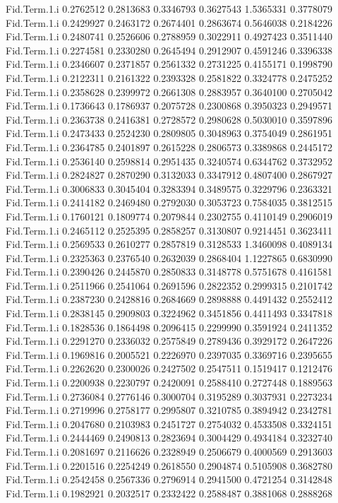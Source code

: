\documentclass[11pt]{article} %
\begin{document}
\begin{Schunk}
\begin{Soutput}
Fid.Term.1.i 0.2762512 0.2813683 0.3346793 0.3627543 1.5365331 0.3778079
Fid.Term.1.i 0.2429927 0.2463172 0.2674401 0.2863674 0.5646038 0.2184226
Fid.Term.1.i 0.2480741 0.2526606 0.2788959 0.3022911 0.4927423 0.3511440
Fid.Term.1.i 0.2274581 0.2330280 0.2645494 0.2912907 0.4591246 0.3396338
Fid.Term.1.i 0.2346607 0.2371857 0.2561332 0.2731225 0.4155171 0.1998790
Fid.Term.1.i 0.2122311 0.2161322 0.2393328 0.2581822 0.3324778 0.2475252
Fid.Term.1.i 0.2358628 0.2399972 0.2661308 0.2883957 0.3640100 0.2705042
Fid.Term.1.i 0.1736643 0.1786937 0.2075728 0.2300868 0.3950323 0.2949571
Fid.Term.1.i 0.2363738 0.2416381 0.2728572 0.2980628 0.5030010 0.3597896
Fid.Term.1.i 0.2473433 0.2524230 0.2809805 0.3048963 0.3754049 0.2861951
Fid.Term.1.i 0.2364785 0.2401897 0.2615228 0.2806573 0.3389868 0.2445172
Fid.Term.1.i 0.2536140 0.2598814 0.2951435 0.3240574 0.6344762 0.3732952
Fid.Term.1.i 0.2824827 0.2870290 0.3132033 0.3347912 0.4807400 0.2867927
Fid.Term.1.i 0.3006833 0.3045404 0.3283394 0.3489575 0.3229796 0.2363321
Fid.Term.1.i 0.2414182 0.2469480 0.2792030 0.3053723 0.7584035 0.3812515
Fid.Term.1.i 0.1760121 0.1809774 0.2079844 0.2302755 0.4110149 0.2906019
Fid.Term.1.i 0.2465112 0.2525395 0.2858257 0.3130807 0.9214451 0.3623411
Fid.Term.1.i 0.2569533 0.2610277 0.2857819 0.3128533 1.3460098 0.4089134
Fid.Term.1.i 0.2325363 0.2376540 0.2632039 0.2868404 1.1227865 0.6830990
Fid.Term.1.i 0.2390426 0.2445870 0.2850833 0.3148778 0.5751678 0.4161581
Fid.Term.1.i 0.2511966 0.2541064 0.2691596 0.2822352 0.2999315 0.2101742
Fid.Term.1.i 0.2387230 0.2428816 0.2684669 0.2898888 0.4491432 0.2552412
Fid.Term.1.i 0.2838145 0.2909803 0.3224962 0.3451856 0.4411493 0.3347818
Fid.Term.1.i 0.1828536 0.1864498 0.2096415 0.2299990 0.3591924 0.2411352
Fid.Term.1.i 0.2291270 0.2336032 0.2575849 0.2789436 0.3929172 0.2647226
Fid.Term.1.i 0.1969816 0.2005521 0.2226970 0.2397035 0.3369716 0.2395655
Fid.Term.1.i 0.2262620 0.2300026 0.2427502 0.2547511 0.1519417 0.1212476
Fid.Term.1.i 0.2200938 0.2230797 0.2420091 0.2588410 0.2727448 0.1889563
Fid.Term.1.i 0.2736084 0.2776146 0.3000704 0.3195289 0.3037931 0.2273234
Fid.Term.1.i 0.2719996 0.2758177 0.2995807 0.3210785 0.3894942 0.2342781
Fid.Term.1.i 0.2047680 0.2103983 0.2451727 0.2754032 0.4533508 0.3324151
Fid.Term.1.i 0.2444469 0.2490813 0.2823694 0.3004429 0.4934184 0.3232740
Fid.Term.1.i 0.2081697 0.2116626 0.2328949 0.2506679 0.4000569 0.2913603
Fid.Term.1.i 0.2201516 0.2254249 0.2618550 0.2904874 0.5105908 0.3682780
Fid.Term.1.i 0.2542458 0.2567336 0.2796914 0.2941500 0.4721254 0.3142848
Fid.Term.1.i 0.1982921 0.2032517 0.2332422 0.2588487 0.3881068 0.2888268

\end{Soutput}
\end{Schunk}
\end{document}
